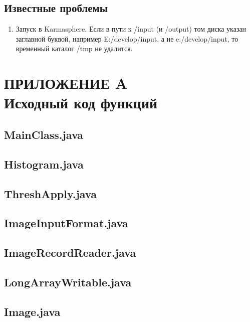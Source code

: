 \documentclass[12pt,a4paper]{extarticle} %
\begin{document}
\subsection{Известные проблемы}
\begin{enumerate}
    \item Запуск в Karmasphere. Если в пути к /input (и /output) том диска указан заглавной буквой, например E:/develop/input, а не e:/develop/input, то временный каталог /tmp не удалится.
\end{enumerate}


\newpage\clearpage
\section*{ПРИЛОЖЕНИЕ A\\ Исходный код функций}
\label{inc:source}
\small
\sloppy
\subsection*{MainClass.java}

\subsection*{Histogram.java}

\subsection*{ThreshApply.java}

\subsection*{ImageInputFormat.java}

\subsection*{ImageRecordReader.java}

\subsection*{LongArrayWritable.java}

\subsection*{Image.java}

%
%
\end{document}
